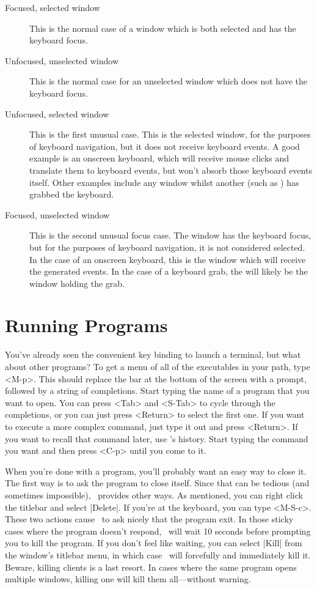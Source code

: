 \begin{description}
  \item[Focused, selected window] This is the normal case of a
    window which is both selected and has the keyboard focus.
  \item[Unfocused, unselected window] This is the normal case for an
    unselected window which does not have the keyboard focus.
  \item[Unfocused, selected window] This is the first unusual
    case. This is the selected window, for the purposes of
    keyboard navigation, but it does not receive keyboard events.
    A good example is an onscreen keyboard, which will receive
    mouse clicks and translate them to keyboard events, but
    won't absorb those keyboard events itself. Other examples
    include any window whilst another (such as \wimenu) has
    grabbed the keyboard.
  \item[Focused, unselected window] This is the second unusual
    focus case. The window has the keyboard focus, but for the
    purposes of keyboard navigation, it is not considered
    selected. In the case of an onscreen keyboard, this is the
    window which will receive the generated events. In the case
    of a keyboard grab, the will likely be the window holding
    the grab.
\end{description}

\section{Running Programs}

You've already seen the convenient key binding to launch a
terminal, but what about other programs? To get a menu of all of
the executables in your path, type <M-p>. This should replace
the bar at the bottom of the screen with a prompt, followed by a
string of completions. Start typing the name of a program that
you want to open. You can press <Tab> and <S-Tab> to cycle
through the completions, or you can just press <Return> to
select the first one. If you want to execute a more complex
command, just type it out and press <Return>. If you want to
recall that command later, use \wimenu's history. Start typing
the command you want and then press <C-p> until you come to it.

When you're done with a program, you'll probably want an easy
way to close it. The first way is to ask the program to close
itself. Since that can be tedious (and sometimes impossible),
\wmii\ provides other ways. As mentioned, you can right click
the titlebar and select |Delete|. If you're at the keyboard,
you can type <M-S-c>. These two actions cause \wmii\ to ask
nicely that the program exit. In those sticky cases where the
program doesn't respond, \wmii\ will wait 10 seconds before
prompting you to kill the program. If you don't feel like
waiting, you can select |Kill| from the window's titlebar
menu, in which case \wmii\ will forcefully and immediately kill
it. Beware, killing clients is a last resort. In cases where the
same program opens multiple windows, killing one will kill them
all—without warning.

